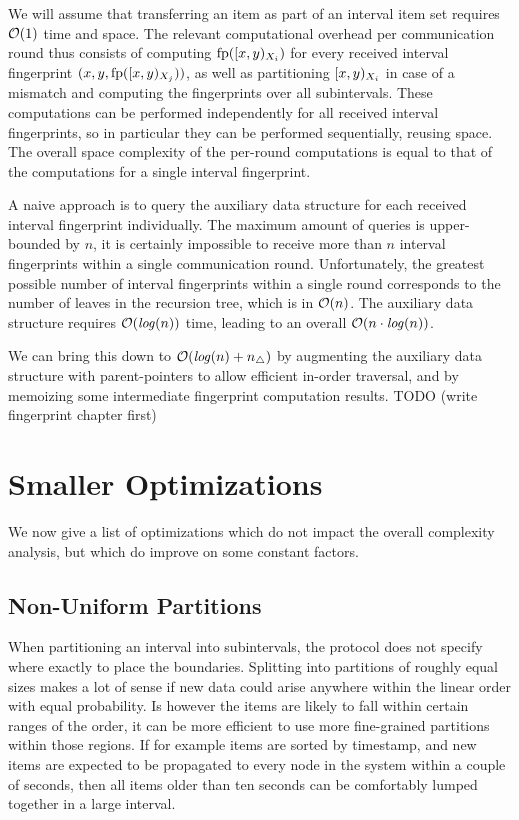We will assume that transferring an item as part of an interval item set requires $\mathcal{O}(1)$ time and space. The relevant computational overhead per communication round thus consists of computing $\operatorname{fp}([{x},{y})_{X_i})$ for every received interval fingerprint $({x}, {y}, {\operatorname{fp}([{x},{y})_{X_j})})$, as well as partitioning $[{x},{y})_{X_i}$ in case of a mismatch and computing the fingerprints over all subintervals. These computations can be performed independently for all received interval fingerprints, so in particular they can be performed sequentially, reusing space. The overall space complexity of the per-round computations is equal to that of the computations for a single interval fingerprint.

A naive approach is to query the auxiliary data structure for each received interval fingerprint individually. The maximum amount of queries is upper-bounded by $n$, it is certainly impossible to receive more than $n$ interval fingerprints within a single communication round. Unfortunately, the greatest possible number of interval fingerprints within a single round corresponds to the number of leaves in the recursion tree, which is in $\mathcal{O}(n)$. The auxiliary data structure requires $\mathcal{O}(\mathit{log}(n))$ time, leading to an overall $\mathcal{O}(n \cdot \mathit{log}(n))$.

We can bring this down to $\mathcal{O}(\mathit{log}(n) + n_{\triangle})$ by augmenting the auxiliary data structure with parent-pointers to allow efficient in-order traversal, and by memoizing some intermediate fingerprint computation results. TODO (write fingerprint chapter first)

\section{Smaller Optimizations}
\label{set-reconciliation-simple-optimizations}

We now give a list of optimizations which do not impact the overall complexity analysis, but which do improve on some constant factors.

\subsection{Non-Uniform Partitions}

When partitioning an interval into subintervals, the protocol does not specify where exactly to place the boundaries. Splitting into partitions of roughly equal sizes makes a lot of sense if new data could arise anywhere within the linear order with equal probability. Is however the items are likely to fall within certain ranges of the order, it can be more efficient to use more fine-grained partitions within those regions. If for example items are sorted by timestamp, and new items are expected to be propagated to every node in the system within a couple of seconds, then all items older than ten seconds can be comfortably lumped together in a large interval.

